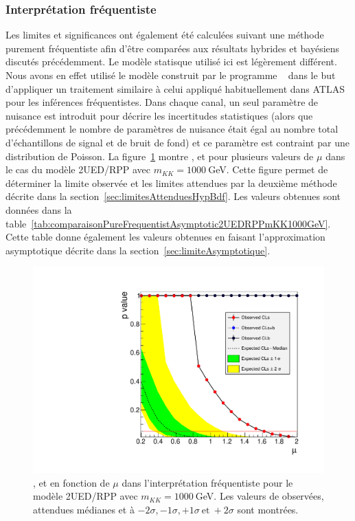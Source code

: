\subsubsection{Interpr\'etation fr\'equentiste}
\label{sec:fourtopsResultatsFreq}

Les limites et significances ont \'egalement \'et\'e calcul\'ees suivant une m\'ethode purement fr\'equentiste afin d'\^etre compar\'ees aux r\'esultats hybrides et bay\'esiens discut\'es pr\'ec\'edemment. 
Le mod\`ele statisque utilis\'e ici est l\'eg\`erement diff\'erent. 
Nous avons en effet utilis\'e le mod\`ele construit par le programme \histfactory~\cite{Cranmer:1456844} dans le but d'appliquer un traitement similaire \`a celui appliqu\'e habituellement dans ATLAS pour les inf\'erences fr\'equentistes. 
Dans chaque canal, un seul param\`etre de nuisance est introduit pour d\'ecrire les incertitudes statistiques (alors que pr\'ec\'edemment le nombre de param\`etres de nuisance \'etait \'egal au nombre total d'\'echantillons de signal et de bruit de fond) et ce param\`etre est contraint par une distribution de Poisson. 
La figure~\ref{fig:pureFrequentistmKK1000GeVScan} montre \CLsb, \CLb{} et \CLs{} pour plusieurs valeurs de $\mu$ dans le cas du mod\`ele 2UED/RPP avec $m_{KK}=1000~$GeV. Cette figure permet de d\'eterminer la limite observ\'ee et les limites attendues par la deuxi\`eme m\'ethode d\'ecrite dans la section~\ref{sec:limitesAttenduesHypBdf}. 
Les valeurs obtenues sont donn\'ees dans la table~\ref{tab:comparaisonPureFrequentistAsymptotic2UEDRPPmKK1000GeV}. Cette table donne \'egalement les valeurs obtenues en faisant l'approximation asymptotique d\'ecrite dans la section~\ref{sec:limiteAsymptotique}. 

\begin{figure}[!htb]
\begin{center}
\includegraphics[width=0.5\linewidth]{figures/pureFrequentistmKK1000GeVScan.pdf}
\end{center}
\vspace*{-0.3cm}
\caption{\CLs{}, \CLsb{} et \CLb{} en fonction de $\mu$ dans l'interpr\'etation fr\'equentiste pour le mod\`ele 2UED/RPP avec $m_{KK}=1000~$GeV. Les valeurs de \CLs{} observ\'ees, attendues m\'edianes et \`a $-2\sigma, -1\sigma, +1\sigma~\text{et}~+2\sigma$ sont montr\'ees.\label{fig:pureFrequentistmKK1000GeVScan}}
\end{figure}

